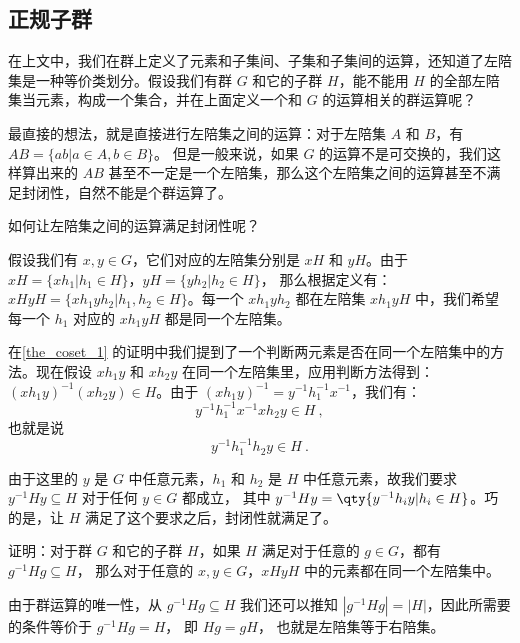 

\subsection{正规子群}

在上文中，我们在群上定义了元素和子集间、子集和子集间的运算，还知道了左陪集是一种等价类划分。假设我们有群 $G$ 和它的子群 $H$，能不能用 $H$ 的全部左陪集当元素，构成一个集合，并在上面定义一个和 $G$ 的运算相关的群运算呢？

最直接的想法，就是直接进行左陪集之间的运算：对于左陪集 $A$ 和 $B$，有 $AB=\{ab|a\in A, b\in B\}$。 但是一般来说，如果 $G$ 的运算不是可交换的，我们这样算出来的 $AB$ 甚至不一定是一个左陪集，那么这个左陪集之间的运算甚至不满足封闭性，自然不能是个群运算了。

如何让左陪集之间的运算满足封闭性呢？

假设我们有 $x, y\in G$，它们对应的左陪集分别是 $xH$ 和 $yH$。由于 $xH=\{xh_1|h_1\in H\}$，$yH=\{yh_2|h_2\in H\}$， 那么根据定义有：$xHyH=\{xh_1yh_2|h_1, h_2\in H\}$。每一个 $xh_1yh_2$ 都在左陪集 $xh_1yH$ 中，我们希望每一个 $h_1$ 对应的 $xh_1yH$ 都是同一个左陪集。

在\autoref{the_coset_1}  的证明中我们提到了一个判断两元素是否在同一个左陪集中的方法。现在假设 $xh_1y$ 和 $xh_2y$ 在同一个左陪集里，应用判断方法得到：$(xh_1y)^{-1}(xh_2y)\in H$。由于 $(xh_1y)^{-1}=y^{-1}h_1^{-1}x^{-1}$，我们有：
\begin{equation}
y^{-1}h_1^{-1}x^{-1}xh_2y\in H~,
\end{equation}
也就是说
\begin{equation}\label{eq_NormSG_1}
y^{-1}h^{-1}_1h_2y\in H~.
\end{equation}

由于这里的 $y$ 是 $G$ 中任意元素，$h_1$ 和 $h_2$ 是 $H$ 中任意元素，故我们要求 $y^{-1}Hy\subseteq H$ 对于任何 $y\in G$ 都成立， 其中 $y^{-1}Hy = \qty{y^{-1}h_i y|h_i \in H}$。巧的是，让 $H$ 满足了这个要求之后，封闭性就满足了。

\begin{exercise}{}\label{exe_NormSG_1}
证明：对于群 $G$ 和它的子群 $H$，如果 $H$ 满足对于任意的 $g\in G$，都有 $g^{-1}Hg\subseteq H$， 那么对于任意的 $x, y\in G$，$xHyH$ 中的元素都在同一个左陪集中。
\end{exercise}

\begin{corollary}{}\label{cor_NormSG_1}
由于群运算的唯一性，从 $g^{-1}Hg\subseteq H$ 我们还可以推知 $|g^{-1}Hg|=|H|$，因此所需要的条件等价于 $g^{-1}Hg=H$， 即 $Hg = gH$， 也就是左陪集等于右陪集。
\end{corollary}

